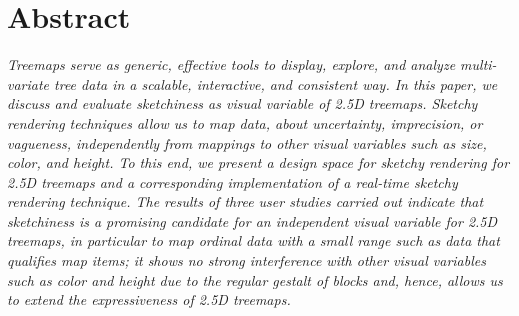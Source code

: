 \section*{\centering Abstract}
{\em\noindent
Treemaps serve as generic, effective tools to display, explore, and analyze multi-variate tree data in a scalable, interactive, and consistent way.  
In this paper, we discuss and evaluate sketchiness as visual variable of 2.5D treemaps.  
Sketchy rendering techniques allow us to map data, 
\eg about uncertainty, imprecision, or vagueness, 
independently from mappings to other visual variables such as size, color, and height. 
To this end, 
we present a design space for sketchy rendering for 2.5D treemaps 
and a corresponding implementation of a real-time sketchy rendering technique. 
The results of three user studies carried out indicate that 
sketchiness is a promising candidate for an independent visual variable for 2.5D treemaps, 
in particular to map ordinal data with a small range such as data that qualifies map items;
it shows no strong interference with other visual variables such as color and height 
due to the regular gestalt of blocks and, hence, allows us to extend the expressiveness of 2.5D treemaps. 
}
